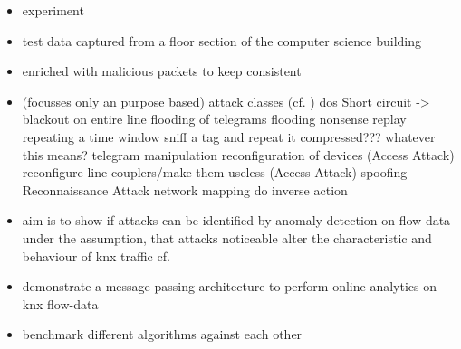 
\begin{itemize}
	\item experiment
	\item test data captured from a floor section of the computer science building
	\item enriched with malicious packets to keep consistent
	
	\item (focusses only an purpose based) attack classes (cf. \parencite{Uma2013})
		\subitem \gls{dos}
			\subsubitem Short circuit -> blackout on entire line
			\subsubitem flooding of  telegrams
			\subsubitem flooding nonsense
		\subitem replay
			\subsubitem repeating a time window
			\subsubitem sniff a tag and repeat it compressed??? \alert{whatever this means?}
		\subitem telegram manipulation
		\subitem reconfiguration of devices (Access Attack)
		\subitem reconfigure line couplers/make them useless (Access Attack)
		\subitem spoofing 
		\subitem Reconnaissance Attack
			\subsubitem network mapping
			\subsubitem do inverse action
		\subitem 
	
	\item aim is to show if attacks can be identified by anomaly detection on flow data
		\subitem under the assumption, that attacks noticeable alter the characteristic and behaviour of \gls{knx} traffic
		\subitem cf. \parencite{Mukherjee1994,Yang2006,Pan2014}
	\item demonstrate a message-passing architecture to perform online analytics on \gls{knx} flow-data
	\item benchmark different algorithms against each other
\end{itemize}

\begin{comment}
Angriffe:

DoS
	Kurzschluss im Bus -> DoS auf gesamtem Segment
	A_Restart-Pakete -> DoS gegen einzelne Teilnehmer
Replay-Angriffe
	Zeit mitschneiden -> wiedergeben
	Tag mitschneiden, komprimiert wiedergeben
Manipulation von Paketen (Payload tauschen)
Konfiguration manipulieren
Überwindung von Linienkopplern
Address-Spoofing
	falsche Adresse in Liniensegment
	mit existierender Adresse senden
Netzanalyse mit knxMap (https://github.com/takeshixx/knxmap)
Mitlesen und sofort gegenteilige Aktion auslösen
High-Level-Angriffe:
	nur best. Aktionen zulassen
	Provokation/Sabotage von menschl. Verhalten
Social-Engineering -> Einschleusen von Geräten
\end{comment}